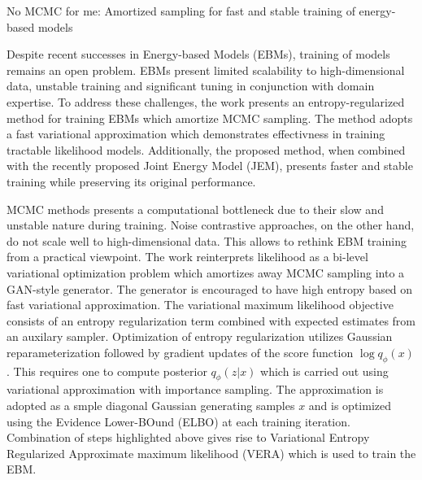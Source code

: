 \documentclass[11pt,letterpaper]{article}
\begin{document}
\begin{center}
  \large{No MCMC for me: Amortized sampling for fast and stable training of energy-based models}
\end{center}

Despite recent successes in Energy-based Models (EBMs), training of models remains an open problem. EBMs present limited scalability to high-dimensional data, unstable training and significant tuning in conjunction with domain expertise. To address these challenges, the work presents an entropy-regularized method for training EBMs which amortize MCMC sampling. The method adopts a fast variational approximation which demonstrates effectivness in training tractable likelihood models. Additionally, the proposed method, when combined with the recently proposed Joint Energy Model (JEM), presents faster and stable training while preserving its original performance. 

MCMC methods presents a computational bottleneck due to their slow and unstable nature during training. Noise contrastive approaches, on the other hand, do not scale well to high-dimensional data. This allows to rethink EBM training from a practical viewpoint. The work reinterprets likelihood as a bi-level variational optimization problem which amortizes away MCMC sampling into a GAN-style generator. The generator is encouraged to have high entropy based on fast variational approximation. The variational maximum likelihood objective consists of an entropy regularization term combined with expected estimates from an auxilary sampler. Optimization of entropy regularization utilizes Gaussian reparameterization followed by gradient updates of the score function $\log q_{\phi}(x)$. This requires one to compute posterior $q_{\phi}(z|x)$ which is carried out using variational approximation with importance sampling. The approximation is adopted as a smple diagonal Gaussian generating samples $x$ and is optimized using the Evidence Lower-BOund (ELBO) at each training iteration. Combination of steps highlighted above gives rise to Variational Entropy Regularized Approximate maximum likelihood (VERA) which is used to train the EBM.  
\end{document}
